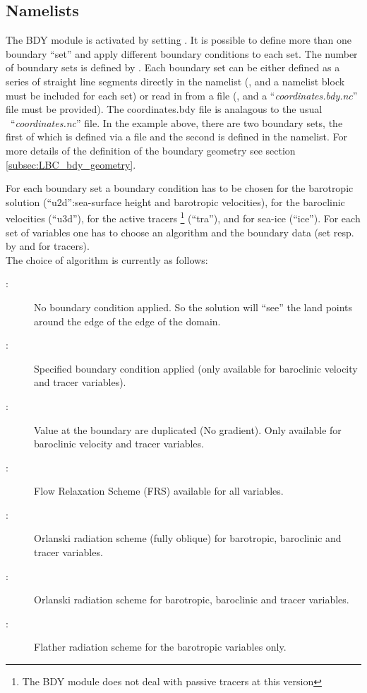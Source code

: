 \documentclass[../main/NEMO_manual]{subfiles}
\begin{document}
\subsection{Namelists}
\label{subsec:LBC_bdy_namelist}

The BDY module is activated by setting  .
It is possible to define more than one boundary ``set'' and apply different boundary conditions to each set.
The number of boundary sets is defined by .
Each boundary set can be either defined as a series of straight line segments directly in the namelist
(, and a namelist block  must be included for each set) or read in from a file (, and a ``\textit{coordinates.bdy.nc}'' file must be provided).
The coordinates.bdy file is analagous to the usual \NEMO\ ``\textit{coordinates.nc}'' file.
In the example above, there are two boundary sets, the first of which is defined via a file and
the second is defined in the namelist.
For more details of the definition of the boundary geometry see section \autoref{subsec:LBC_bdy_geometry}.

For each boundary set a boundary condition has to be chosen for the barotropic solution
(``u2d'':sea-surface height and barotropic velocities), for the baroclinic velocities (``u3d''),
for the active tracers \footnote{The BDY module does not deal with passive tracers at this version} (``tra''), and for sea-ice (``ice'').
For each set of variables one has to choose an algorithm and the boundary data (set resp. by  and  for tracers).\\

The choice of algorithm is currently as follows:

\begin{description}
\item [:] No boundary condition applied.
  So the solution will ``see'' the land points around the edge of the edge of the domain.
\item [:] Specified boundary condition applied (only available for baroclinic velocity and tracer variables).
\item [:] Value at the boundary are duplicated (No gradient). Only available for baroclinic velocity and tracer variables.
\item [:] Flow Relaxation Scheme (FRS) available for all variables.
\item [:] Orlanski radiation scheme (fully oblique) for barotropic, baroclinic and tracer variables.
\item [:] Orlanski radiation scheme for barotropic, baroclinic and tracer variables.
\item [:] Flather radiation scheme for the barotropic variables only.
\end{description}
\end{document}
